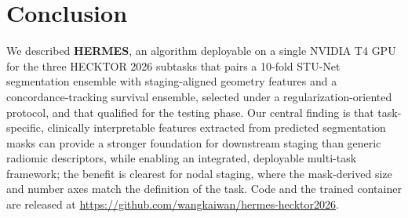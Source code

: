 \documentclass[runningheads]{llncs}
\begin{document}
\section{Conclusion}

We described \textbf{HERMES}, an algorithm deployable on a single NVIDIA T4 GPU for the three HECKTOR 2026 subtasks that pairs a 10-fold STU-Net segmentation ensemble with staging-aligned geometry features and a concordance-tracking survival ensemble, selected under a regularization-oriented protocol, and that qualified for the testing phase. Our central finding is that task-specific, clinically interpretable features extracted from predicted segmentation masks can provide a stronger foundation for downstream staging than generic radiomic descriptors, while enabling an integrated, deployable multi-task framework; the benefit is clearest for nodal staging, where the mask-derived size and number axes match the definition of the task. Code and the trained container are released at \url{https://github.com/wangkaiwan/hermes-hecktor2026}.
\end{document}
